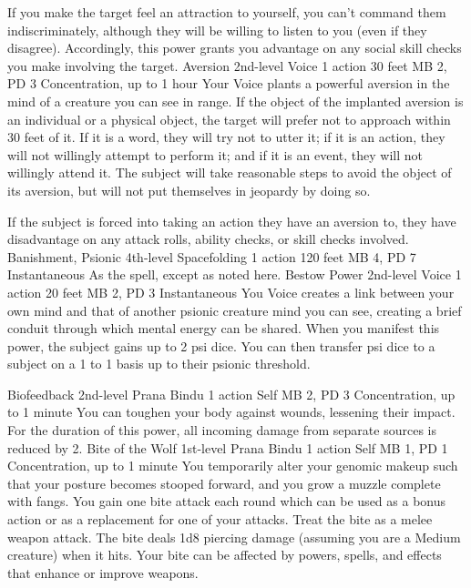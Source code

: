 If you make the target feel an attraction to yourself, you
can't command them indiscriminately, although they will be
willing to listen to you (even if they disagree). Accordingly,
this power grants you advantage on any social skill checks
you make involving the target.
\DndPowerHeader%
    {Aversion\label{pwr:aversion}}
    {2nd-level Voice}
    {1 action}
    {30 feet}
    {MB 2, PD 3}
    {Concentration, up to 1 hour}
Your Voice plants a powerful aversion in
the mind of a creature you can see in range. If the object
of the implanted aversion is an individual or a physical object,
the target will prefer not to approach within 30 feet of it.
If it is a word, they will try not to utter it; if it is an
action, they will not willingly attempt to perform it; and
if it is an event, they will not willingly attend it. The
subject will take reasonable steps to avoid the object of
its aversion, but will not put themselves in jeopardy by doing
so.

If the subject is forced into taking an action they have an
aversion to, they have disadvantage on any attack rolls, ability
checks, or skill checks involved.
\DndPowerHeader%
    {Banishment, Psionic\label{pwr:banishment_psionic}}
    {4th-level Spacefolding}
    {1 action}
    {120 feet}
    {MB 4, PD 7}
    {Instantaneous}
As the  spell, except as
noted here.
\DndPowerHeader%
    {Bestow Power\label{pwr:bestow_power}}
    {2nd-level Voice}
    {1 action}
    {20 feet}
    {MB 2, PD 3}
    {Instantaneous}
You Voice creates a link between your own
mind and that of another psionic creature mind you can see,
creating a brief conduit through which mental energy can be
shared. When you manifest this power, the subject gains up
to 2 psi dice. You can then transfer psi dice to a subject
on a 1 to 1 basis up to their psionic threshold.

\DndPowerHeader%
    {Biofeedback\label{pwr:biofeedback}}
    {2nd-level Prana Bindu}
    {1 action}
    {Self}
    {MB 2, PD 3}
    {Concentration, up to 1 minute}
You can toughen your body against wounds,
lessening their impact. For the duration of this power,
all incoming damage from separate sources is reduced by 2.
\DndPowerHeader%
    {Bite of the Wolf\label{pwr:bite_of_the_wolf}}
    {1st-level Prana Bindu}
    {1 action}
    {Self}
    {MB 1, PD 1}
    {Concentration, up to 1 minute}
You temporarily alter your genomic makeup
such that your posture becomes stooped forward, and you grow
a muzzle complete with fangs. You gain one bite attack each
round which can be used as a bonus action or as a replacement
for one of your attacks. Treat the bite as a melee weapon
attack. The bite deals 1d8 piercing damage (assuming you are
a Medium creature) when it hits. Your bite can be affected
by powers, spells, and effects that enhance or improve weapons.

